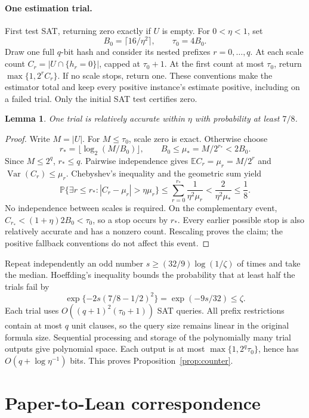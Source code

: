 \documentclass[11pt]{article}
\newtheorem{lemma}[theorem]{Lemma}
\theoremstyle{remark}
\newcommand{\E}{\mathbb E}
\newcommand{\Prob}{\mathbb P}
\begin{document}
\paragraph{One estimation trial.}
First test SAT, returning zero exactly if \(U\) is empty.
For \(0<\eta<1\), set
\[
 B_0=\lceil16/\eta^2\rceil,\qquad \tau_0=4B_0.
\]
Draw one full \(q\)-bit hash and consider its nested prefixes
\(r=0,\ldots,q\). At each scale count
\(C_r=|U\cap\{h_r=0\}|\), capped at \(\tau_0+1\).
At the first count at most \(\tau_0\), return
\(\max\{1,2^rC_r\}\). If no scale stops, return one.
These conventions make the estimator total and keep every positive
instance's estimate positive, including on a failed trial.
Only the initial SAT test certifies zero.

\begin{lemma}\label{lem:trial}
One trial is relatively accurate within \(\eta\) with probability
at least \(7/8\).
\end{lemma}
\begin{proof}
Write \(M=|U|\). For \(M\le\tau_0\), scale zero is exact.
Otherwise choose
\[
 r_*=\lfloor\log_2(M/B_0)\rfloor,\qquad
 B_0\le\mu_*=M/2^{r_*}<2B_0.
\]
Since \(M\le2^q\), \(r_*\le q\).
Pairwise independence gives
\(\E C_r=\mu_r=M/2^r\) and \(\operatorname{Var}(C_r)\le\mu_r\).
Chebyshev's inequality and the geometric sum yield
\[
 \Prob\{\exists r\le r_*:|C_r-\mu_r|>\eta\mu_r\}
 \le\sum_{r=0}^{r_*}\frac1{\eta^2\mu_r}
 <\frac2{\eta^2\mu_*}\le\frac18.
\]
No independence between scales is required.
On the complementary event,
\(C_{r_*}<(1+\eta)2B_0<\tau_0\), so a stop occurs by \(r_*\).
Every earlier possible stop is also relatively accurate and
has a nonzero count. Rescaling proves the claim; the positive
fallback conventions do not affect this event.
\end{proof}

Repeat independently an odd number
\(s\ge(32/9)\log(1/\zeta)\) of times and take the median.
Hoeffding's inequality bounds the probability that at least half
the trials fail by
\[
 \exp\{-2s(7/8-1/2)^2\}=\exp(-9s/32)\le\zeta.
\]
Each trial uses \(O((q+1)^2(\tau_0+1))\) SAT queries.
All prefix restrictions contain at most \(q\) unit clauses,
so the query size remains linear in the original formula size.
Sequential processing and storage of the polynomially many
trial outputs give polynomial space. Each output is at most
\(\max\{1,2^q\tau_0\}\), hence has \(O(q+\log\eta^{-1})\) bits.
This proves Proposition~\ref{prop:counter}.

\section{Paper-to-Lean correspondence}
\label{app:correspondence}
\end{document}
